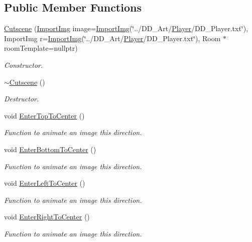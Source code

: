 \subsection*{Public Member Functions}
\begin{DoxyCompactItemize}
\item 
\hyperlink{classCutscene_aed118d443c7a13d7bac403875d4c9924}{Cutscene} (\hyperlink{classImportImg}{Import\-Img} image=\hyperlink{classImportImg}{Import\-Img}(\char`\"{}../D\-D\-\_\-\-Art/\hyperlink{classPlayer}{Player}/D\-D\-\_\-\-Player.\-txt\char`\"{}), Import\-Img r=\hyperlink{classImportImg}{Import\-Img}(\char`\"{}../D\-D\-\_\-\-Art/\hyperlink{classPlayer}{Player}/D\-D\-\_\-\-Player.\-txt\char`\"{}), Room $\ast$room\-Template=nullptr)
\begin{DoxyCompactList}\small\item\em Constructor. \end{DoxyCompactList}\item 
\hyperlink{classCutscene_a87f27f6e952b056528f7974e075e737b}{$\sim$\-Cutscene} ()
\begin{DoxyCompactList}\small\item\em Destructor. \end{DoxyCompactList}\item 
void \hyperlink{classCutscene_afa9eb952cbdf82068a57dc9cf0bf18af}{Enter\-Top\-To\-Center} ()
\begin{DoxyCompactList}\small\item\em Function to animate an image this direction. \end{DoxyCompactList}\item 
void \hyperlink{classCutscene_a169e1c53a82b22a8a38cf652b81fddec}{Enter\-Bottom\-To\-Center} ()
\begin{DoxyCompactList}\small\item\em Function to animate an image this direction. \end{DoxyCompactList}\item 
void \hyperlink{classCutscene_a2475a1d172b3d60e9c6c0d51032a34f7}{Enter\-Left\-To\-Center} ()
\begin{DoxyCompactList}\small\item\em Function to animate an image this direction. \end{DoxyCompactList}\item 
void \hyperlink{classCutscene_a2b8b64265f23d6f8c27a226cd200175d}{Enter\-Right\-To\-Center} ()
\begin{DoxyCompactList}\small\item\em Function to animate an image this direction. \end{DoxyCompactList}\item 

\end{DoxyCompactItemize}

